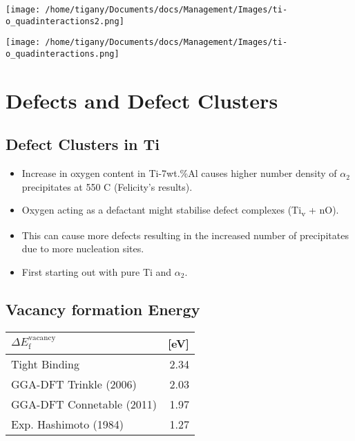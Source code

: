 \documentclass[11pt]{article}
\begin{document}
\begin{center}
\texttt{[image: /home/tigany/Documents/docs/Management/Images/ti-o\_quadinteractions2.png]}
\end{center}

\begin{center}
\texttt{[image: /home/tigany/Documents/docs/Management/Images/ti-o\_quadinteractions.png]}
\end{center}


\section*{Defects and Defect Clusters}
\label{sec:org1b54115}


\subsection*{Defect Clusters in Ti}
\label{sec:orgba536a8}

\begin{itemize}
\item Increase in oxygen content in Ti-7wt.\%Al causes higher number density of
\(\alpha_2\) precipitates at 550\textdegree{} C (Felicity's results).
\item Oxygen acting as a defactant might stabilise defect complexes (Ti\textsubscript{v} + nO).
\item This can cause more defects resulting in the increased number of precipitates due to more nucleation sites.
\item First starting out with pure Ti and \(\alpha_2\).
\end{itemize}

\subsection*{Vacancy formation Energy}
\label{sec:org96fae6d}

\begin{center}
\begin{tabular}{lr}
\(\Delta E_{\text{f}}^{\text{vacancy}}\) & [eV]\\
\hline
Tight Binding & 2.34\\
GGA-DFT Trinkle (2006) & 2.03\\
GGA-DFT Connetable (2011) & 1.97\\
Exp. Hashimoto (1984) & 1.27\\
\hline
\end{tabular}
\end{center}
\end{document}
